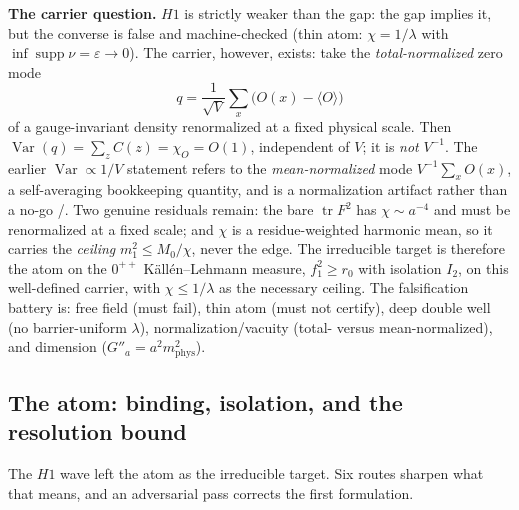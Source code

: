\textbf{The carrier question.} $H1$ is strictly weaker than the gap: the gap implies it, but the
converse is false and machine-checked (thin atom: $\chi=1/\lambda$ with
$\inf\operatorname{supp}\nu=\varepsilon\to0$). The carrier, however, exists: take the
\emph{total-normalized} zero mode
\[
  q=\frac{1}{\sqrt V}\sum_x\bigl(O(x)-\langle O\rangle\bigr)
\]
of a gauge-invariant density renormalized at a fixed physical scale. Then
$\operatorname{Var}(q)=\sum_z C(z)=\chi_O=O(1)$, independent of $V$; it is \emph{not} $V^{-1}$. The
earlier $\operatorname{Var}\propto1/V$ statement refers to the \emph{mean-normalized} mode
$V^{-1}\sum_xO(x)$, a self-averaging bookkeeping quantity, and is a normalization artifact rather than
a no-go \LT/\LE. Two genuine residuals remain: the bare $\operatorname{tr}F^2$ has
$\chi\sim a^{-4}$ and must be renormalized at a fixed scale; and $\chi$ is a residue-weighted harmonic
mean, so it carries the \emph{ceiling} $m_1^2\le M_0/\chi$, never the edge. The irreducible target is
therefore the atom on the $0^{++}$ K\"all\'en--Lehmann measure, $f_1^2\ge r_0$ with isolation $I_2$,
on this well-defined carrier, with $\chi\le1/\lambda$ as the necessary ceiling. The falsification
battery is: free field (must fail), thin atom (must not certify), deep double well (no
barrier-uniform $\lambda$), normalization/vacuity (total- versus mean-normalized), and dimension
($G''_a=a^2m_{\mathrm{phys}}^2$).

\subsection{The atom: binding, isolation, and the resolution bound}

The $H1$ wave left the atom as the irreducible target. Six routes sharpen what that means, and an
adversarial pass corrects the first formulation.

